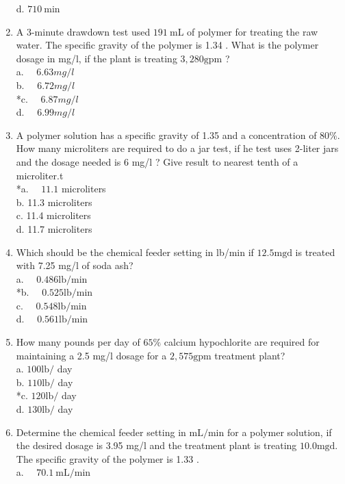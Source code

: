 \begin{enumerate}
d. $710 \mathrm{~min}$\\
\item A 3-minute drawdown test used $191 \mathrm{~mL}$ of polymer for treating the raw water. The specific gravity of the polymer is 1.34 . What is the polymer dosage in mg/l, if the plant is treating $3,280 \mathrm{gpm}$ ?\\
a. $\quad 6.63 mg/l$\\
b. $\quad 6.72 mg/l$\\
*c. $\quad 6.87 mg/l$\\
d. $\quad 6.99 mg/l$\\
\item A polymer solution has a specific gravity of 1.35 and a concentration of $80 \%$. How many microliters are required to do a jar test, if he test uses 2-liter jars and the dosage needed is 6 mg/l ? Give result to nearest tenth of a microliter.t\\
*a. $\quad 11.1$ microliters\\
b. 11.3 microliters\\
c. 11.4 microliters\\
d. 11.7 microliters \\
\item Which should be the chemical feeder setting in lb/min if $12.5 \mathrm{mgd}$ is treated with 7.25 mg/l of soda ash?\\
a. $\quad 0.486 \mathrm{lb} / \mathrm{min}$\\
*b. $\quad 0.525 \mathrm{lb} / \mathrm{min}$\\
c. $\quad 0.548 \mathrm{lb} / \mathrm{min}$\\
d. $\quad 0.561 \mathrm{lb} / \mathrm{min}$\\
\item How many pounds per day of $65 \%$ calcium hypochlorite are required for maintaining a 2.5 mg/l dosage for a $2,575 \mathrm{gpm}$ treatment plant?\\
a. $100 \mathrm{lb} /$ day\\
b. $110 \mathrm{lb} /$ day\\
*c. $120 \mathrm{lb} /$ day\\
d. $130 \mathrm{lb} /$ day\\
\item Determine the chemical feeder setting in $\mathrm{mL} / \mathrm{min}$ for a polymer solution, if the desired dosage is 3.95 mg/l and the treatment plant is treating $10.0 \mathrm{mgd}$. The specific gravity of the polymer is 1.33 .\\
a. $\quad 70.1 \mathrm{~mL} / \mathrm{min}$\\

\end{enumerate}
